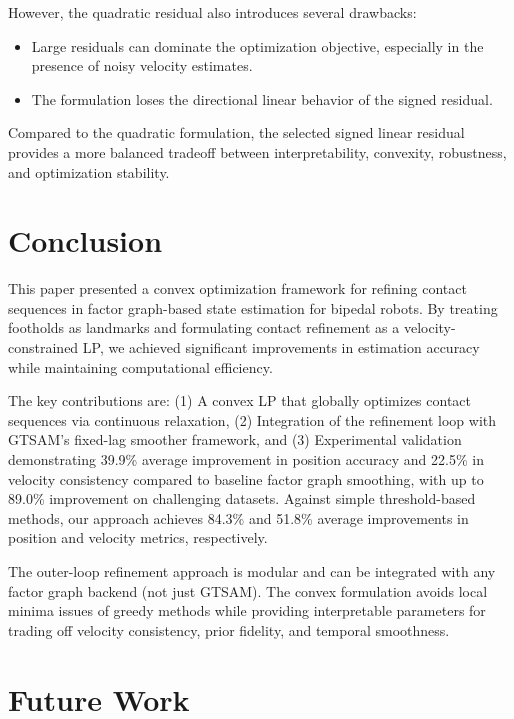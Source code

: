 \documentclass[conference]{IEEEtran}
\begin{document}
However, the quadratic residual also introduces several drawbacks:

\begin{itemize}
    \item Large residuals can dominate the optimization objective, especially in the presence of noisy velocity estimates.
    
    \item The formulation loses the directional linear behavior of the signed residual.
    
\end{itemize}

Compared to the quadratic formulation, the selected signed linear residual provides a more balanced tradeoff between interpretability, convexity, robustness, and optimization stability.


\section{Conclusion}
This paper presented a convex optimization framework for refining contact sequences in factor graph-based state estimation for bipedal robots. By treating footholds as landmarks and formulating contact refinement as a velocity-constrained LP, we achieved significant improvements in estimation accuracy while maintaining computational efficiency.

The key contributions are: (1) A convex LP that globally optimizes contact sequences via continuous relaxation, (2) Integration of the refinement loop with GTSAM's fixed-lag smoother framework, and (3) Experimental validation demonstrating 39.9\% average improvement in position accuracy and 22.5\% in velocity consistency compared to baseline factor graph smoothing, with up to 89.0\% improvement on challenging datasets. Against simple threshold-based methods, our approach achieves 84.3\% and 51.8\% average improvements in position and velocity metrics, respectively.

The outer-loop refinement approach is modular and can be integrated with any factor graph backend (not just GTSAM). The convex formulation avoids local minima issues of greedy methods while providing interpretable parameters for trading off velocity consistency, prior fidelity, and temporal smoothness.

\section{Future Work}
\end{document}
